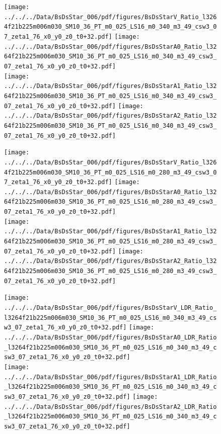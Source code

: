 \documentclass[a4paper,10pt]{article}
\begin{document}
\begin{figure}[p]
 \texttt{[image: ../../../Data/BsDsStar\_006/pdf/figures/BsDsStarV\_Ratio\_l3264f21b225m006m030\_SM10\_36\_PT\_m0\_025\_LS16\_m0\_340\_m3\_49\_csw3\_07\_zeta1\_76\_x0\_y0\_z0\_t0+32.pdf]}  
\texttt{[image: ../../../Data/BsDsStar\_006/pdf/figures/BsDsStarA0\_Ratio\_l3264f21b225m006m030\_SM10\_36\_PT\_m0\_025\_LS16\_m0\_340\_m3\_49\_csw3\_07\_zeta1\_76\_x0\_y0\_z0\_t0+32.pdf]} \\ 
\texttt{[image: ../../../Data/BsDsStar\_006/pdf/figures/BsDsStarA1\_Ratio\_l3264f21b225m006m030\_SM10\_36\_PT\_m0\_025\_LS16\_m0\_340\_m3\_49\_csw3\_07\_zeta1\_76\_x0\_y0\_z0\_t0+32.pdf]}  
\texttt{[image: ../../../Data/BsDsStar\_006/pdf/figures/BsDsStarA2\_Ratio\_l3264f21b225m006m030\_SM10\_36\_PT\_m0\_025\_LS16\_m0\_340\_m3\_49\_csw3\_07\_zeta1\_76\_x0\_y0\_z0\_t0+32.pdf]} \\ 
\end{figure} 
\clearpage

\begin{figure}[p]
 \texttt{[image: ../../../Data/BsDsStar\_006/pdf/figures/BsDsStarV\_Ratio\_l3264f21b225m006m030\_SM10\_36\_PT\_m0\_025\_LS16\_m0\_280\_m3\_49\_csw3\_07\_zeta1\_76\_x0\_y0\_z0\_t0+32.pdf]}  
\texttt{[image: ../../../Data/BsDsStar\_006/pdf/figures/BsDsStarA0\_Ratio\_l3264f21b225m006m030\_SM10\_36\_PT\_m0\_025\_LS16\_m0\_280\_m3\_49\_csw3\_07\_zeta1\_76\_x0\_y0\_z0\_t0+32.pdf]} \\ 
\texttt{[image: ../../../Data/BsDsStar\_006/pdf/figures/BsDsStarA1\_Ratio\_l3264f21b225m006m030\_SM10\_36\_PT\_m0\_025\_LS16\_m0\_280\_m3\_49\_csw3\_07\_zeta1\_76\_x0\_y0\_z0\_t0+32.pdf]}  
\texttt{[image: ../../../Data/BsDsStar\_006/pdf/figures/BsDsStarA2\_Ratio\_l3264f21b225m006m030\_SM10\_36\_PT\_m0\_025\_LS16\_m0\_280\_m3\_49\_csw3\_07\_zeta1\_76\_x0\_y0\_z0\_t0+32.pdf]} \\ 
\end{figure} 
\clearpage

\begin{figure}[p]
 \texttt{[image: ../../../Data/BsDsStar\_006/pdf/figures/BsDsStarV\_LDR\_Ratio\_l3264f21b225m006m030\_SM10\_36\_PT\_m0\_025\_LS16\_m0\_340\_m3\_49\_csw3\_07\_zeta1\_76\_x0\_y0\_z0\_t0+32.pdf]}  
\texttt{[image: ../../../Data/BsDsStar\_006/pdf/figures/BsDsStarA0\_LDR\_Ratio\_l3264f21b225m006m030\_SM10\_36\_PT\_m0\_025\_LS16\_m0\_340\_m3\_49\_csw3\_07\_zeta1\_76\_x0\_y0\_z0\_t0+32.pdf]} \\ 
\texttt{[image: ../../../Data/BsDsStar\_006/pdf/figures/BsDsStarA1\_LDR\_Ratio\_l3264f21b225m006m030\_SM10\_36\_PT\_m0\_025\_LS16\_m0\_340\_m3\_49\_csw3\_07\_zeta1\_76\_x0\_y0\_z0\_t0+32.pdf]}  
\texttt{[image: ../../../Data/BsDsStar\_006/pdf/figures/BsDsStarA2\_LDR\_Ratio\_l3264f21b225m006m030\_SM10\_36\_PT\_m0\_025\_LS16\_m0\_340\_m3\_49\_csw3\_07\_zeta1\_76\_x0\_y0\_z0\_t0+32.pdf]} \\ 
\end{figure} 
\clearpage
\end{document}
